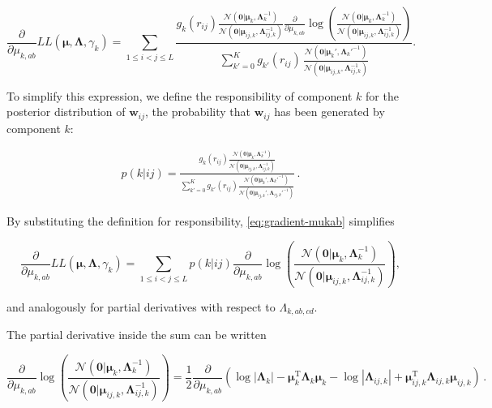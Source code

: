 \documentclass[12pt,a4paper,twoside]{book}
\newcommand{\Gauss}{\mathcal{N}}
\newcommand{\Lijk}{\mathbf{\Lambda}_{ij,k}}
\newcommand{\Lk}{\mathbf{\Lambda}_k}
\newcommand{\muijk}{\mathbf{\mu}_{ij,k}}
\newcommand{\muk}{\mathbf{\mu}_k}
\newcommand{\rij}{r_{ij}}
\newcommand{\wij}{\mathbf{w}_{ij}}
\theoremstyle{definition}
\theoremstyle{definition}
\theoremstyle{remark}
\begin{document}
\begin{equation}
 \frac{\partial}{\partial \mu_{k,ab}} L\!L(\mathbf{\mu}, \mathbf{\Lambda}, \gamma_k)
    = \sum_{1\le i<j\le L}  
    \frac{ 
        g_{k}(\rij) \frac{  \Gauss ( \mathbf{0} | \muk, \Lk^{-1})}{\Gauss( \mathbf{0} | \muijk, \Lijk^{-1})} 
             \frac{\partial}{\partial \mu_{k,ab}}  \log \left( \frac{ \Gauss(\mathbf{0} | \muk, \Lk^{-1})}{\Gauss( \mathbf{0} | \muijk, \Lijk^{-1})} \right)  
     } { \sum_{k'=0}^K g_{k'}(\rij) \, \frac{ \Gauss(\mathbf{0} | \muk', \Lk'^{-1})}{\Gauss( \mathbf{0} | \muijk, \Lijk^{-1})}  } .
\label{eq:gradient-mukab}
\end{equation}

To simplify this expression, we define the responsibility of component
\(k\) for the posterior distribution of \(\wij\), the probability that
\(\wij\) has been generated by component \(k\):

\begin{align}
      p(k|ij)  = 
      \frac{ g_{k}(\rij) \frac{ \Gauss( \mathbf{0} | \muk, \Lk^{-1})}{\Gauss(\mathbf{0} | \muijk, \Lijk^{-1})} } 
    {\sum_{k'=0}^K g_{k'}(\rij) \frac{ \Gauss(\mathbf{0} | \muk', \Lk'^{-1})}{\Gauss( \mathbf{0} | \muijk', \Lijk'^{-1})} }  \,.
\label{eq:responsibilities}
\end{align}

By substituting the definition for responsibility,
\eqref{eq:gradient-mukab} simplifies

\begin{equation}
  \frac{\partial}{\partial \mu_{k,ab}}  L\!L(\mathbf{\mu}, \mathbf{\Lambda}, \gamma_k)
    = \sum_{1\le i<j\le L}  p(k | ij)  \frac{\partial}{\partial \mu_{k,ab}} \log \left( \frac{ \Gauss(\mathbf{0} | \muk, \Lk^{-1})}{\Gauss( \mathbf{0} | \muijk, \Lijk^{-1})} \right) ,
\label{eq:gradient-LL-mukab}
\end{equation}

and analogously for partial derivatives with respect to
\(\Lambda_{k,ab,cd}\).

The partial derivative inside the sum can be written

\begin{equation}
     \frac{\partial}{\partial \mu_{k,ab}} \log \left( \frac{ \Gauss(\mathbf{0} | \muk, \Lk^{-1})}{\Gauss( \mathbf{0} | \muijk, \Lijk^{-1})} \right)
    = \frac{1}{2}  \frac{\partial}{\partial \mu_{k,ab}}   \left( \log | \Lk | - \muk^\mathrm{T} \Lk \muk - \log | \Lijk | + \muijk^\mathrm{T} \Lijk \muijk \right)\,.
\end{equation}
\end{document}
